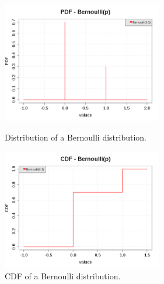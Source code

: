 \begin{figure}[H]
  \begin{minipage}{10cm}
    \begin{center}
      \includegraphics[width=7cm]{pdf_Bernoulli.png}
      \caption{Distribution of a Bernoulli distribution.}
      \label{PDFBernoulli}
    \end{center}
  \end{minipage}
  \hfill
  \begin{minipage}{10cm}
    \begin{center}
      \includegraphics[width=7cm]{cdf_Bernoulli.png}
      \caption{CDF of a Bernoulli distribution.}
      \label{CDFBernoulli}
    \end{center}
  \end{minipage}
\end{figure}





